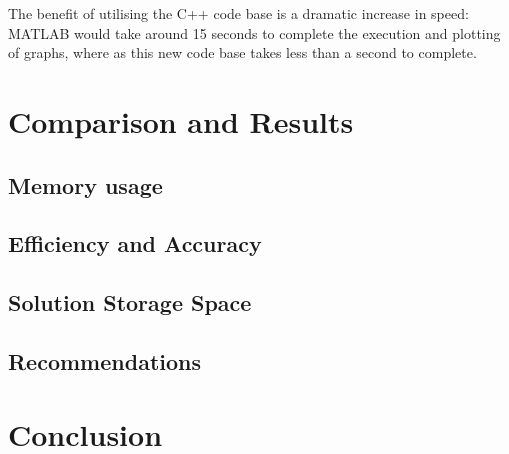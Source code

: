 \documentclass[11pt,draftd]{article}
\begin{document}
\noindent The benefit of utilising the C++ code base is a dramatic increase in speed: MATLAB would take around 15 seconds to complete the execution and plotting of graphs, where as this new code base takes less than a second to complete.
\newpage

\section{Comparison and Results}
\subsection{Memory usage}
\subsection{Efficiency and Accuracy}
\subsection{Solution Storage Space}

\subsection{Recommendations}

\newpage 

\section{Conclusion}
\end{document}
